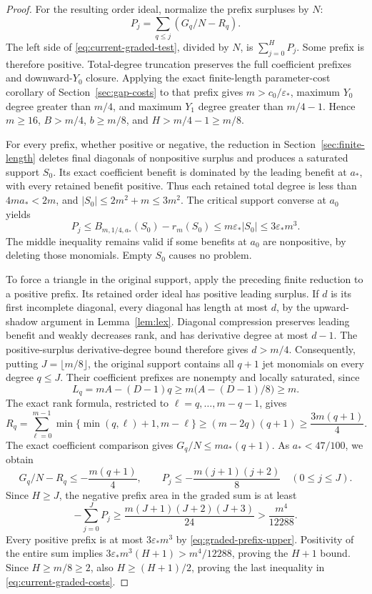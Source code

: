 \begin{proof}
For the resulting order ideal, normalize the prefix surpluses by $N$:
\[
 P_j=\sum_{q\le j}(G_q/N-R_q).
\]
The left side of \eqref{eq:current-graded-test}, divided by $N$, is
$\sum_{j=0}^H P_j$. Some prefix is therefore positive. Total-degree
truncation preserves the full coefficient prefixes and downward-$Y_0$
closure. Applying the exact finite-length parameter-cost corollary of
Section~\ref{sec:gap-costs} to that prefix gives
$m>c_0/\varepsilon_*$, maximum $Y_0$ degree greater than $m/4$, and
maximum $Y_1$ degree greater than $m/4-1$. Hence $m\ge16$,
$B>m/4$, $b\ge m/8$, and $H>m/4-1\ge m/8$.

For every prefix, whether positive or negative, the reduction in
Section~\ref{sec:finite-length} deletes final diagonals of nonpositive
surplus and produces a saturated support $S_0$. Its exact coefficient
benefit is dominated by the leading benefit at $a_*$, with every retained
benefit positive. Thus each retained total degree is less than
$4ma_*<2m$, and $|S_0|\le2m^2+m\le3m^2$. The critical support converse
at $a_0$ yields
\begin{equation}\label{eq:graded-prefix-upper}
 P_j\le B_{m,1/4,a_*}(S_0)-r_m(S_0)
 \le m\varepsilon_*|S_0|\le3\varepsilon_*m^3.
\end{equation}
The middle inequality remains valid if some benefits at $a_0$ are
nonpositive, by deleting those monomials. Empty $S_0$ causes no problem.

To force a triangle in the original support, apply the preceding finite
reduction to a positive prefix. Its retained order ideal has positive
leading surplus. If $d$ is its first incomplete diagonal, every diagonal
has length at most $d$, by the upward-shadow argument in
Lemma~\ref{lem:lex}. Diagonal compression preserves leading benefit and
weakly decreases rank, and has derivative degree at most $d-1$. The
positive-surplus derivative-degree bound therefore gives $d>m/4$.
Consequently, putting $J=\lfloor m/8\rfloor$, the original support contains
all $q+1$ jet monomials on every degree $q\le J$. Their coefficient prefixes are
nonempty and locally saturated, since
\[
 L_q=mA-(D-1)q\ge m\bigl(A-(D-1)/8\bigr)\ge m.
\]
The exact rank formula, restricted to $\ell=q,\ldots,m-q-1$, gives
\[
 R_q=\sum_{\ell=0}^{m-1}\min\{\min(q,\ell)+1,m-\ell\}
 \ge(m-2q)(q+1)\ge\frac{3m(q+1)}4.
\]
The exact coefficient comparison gives $G_q/N\le ma_*(q+1)$.
As $a_*<47/100$, we obtain
\[
 G_q/N-R_q\le-\frac{m(q+1)}4,
 \qquad P_j\le-\frac{m(j+1)(j+2)}8\quad(0\le j\le J).
\]
Since $H\ge J$, the negative prefix area in the graded sum is at least
\[
 -\sum_{j=0}^J P_j\ge\frac{m(J+1)(J+2)(J+3)}{24}
 >\frac{m^4}{12288}.
\]
Every positive prefix is at most $3\varepsilon_*m^3$ by
\eqref{eq:graded-prefix-upper}. Positivity of the entire sum implies
$3\varepsilon_*m^3(H+1)>m^4/12288$, proving the $H+1$ bound.
Since $H\ge m/8\ge2$, also $H\ge(H+1)/2$, proving the last inequality
in \eqref{eq:current-graded-costs}.


\end{proof}
